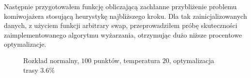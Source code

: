 \documentclass{article}
\begin{document}
        Następnie przygotowałem funkcję obliczającą zachłanne przybliżenie problemu komiwojażera stosującą heurystykę najbliższego kroku. Dla tak zainicjalizowanych danych, z użyciem funkcji arbitrary swap, przeprowadziłem próbę skuteczności zaimplementowanego algorytmu wyżarzania, otrzymując dużo niższe procentowe optymalizacje. 
        \begin{figure}[h!]
            \centering
            \caption{Rozkład normalny, $100$ punktów, temperatura $20$, optymalizacja trasy $3.6\%$}
        \end{figure}\\
\end{document}
